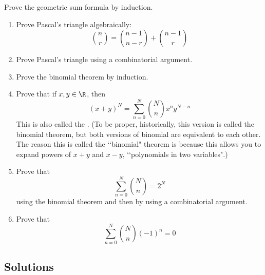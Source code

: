 \newpage
\begin{ex}
  Prove the geometric sum formula by induction.
\end{ex}

\newpage
\begin{ex}
  \mbox{}
  \begin{enumerate}[nosep,label=(\alph*)]
  \item Prove Pascal's triangle algebraically:
    \[
    \binom{n}{r} = \binom{n-1}{n-r} + \binom{n-1}{r}
    \]
  \item Prove Pascal's triangle using a combinatorial argument.
  \item Prove the binomial theorem by induction.
  \item Prove that if $x,y\in \R$, then
    \[
    (x + y)^N = \sum_{n=0}^{N} \binom{N}{n} x^n y^{N-n}
    \]
    This is also called the .
    (To be proper, historically, this version is called the binomial theorem,
    but both versions of binomial are equivalent to each other.
    The reason this is called the \lq\lq binomial" theorem is because
    this allows you to expand powers of $x + y$ and $x - y$, \lq\lq polynomials
    in two variables".)
  \item Prove that
    \[
    \sum_{n=0}^{N} \binom{N}{n} = 2^N
    \]
    using the binomial theorem and then by using a combinatorial argument.
  \item Prove that
    \[
    \sum_{n=0}^{N} \binom{N}{n}(-1)^n = 0
    \]
  \end{enumerate}
\end{ex}

\newpage
\subsection*{Solutions}

